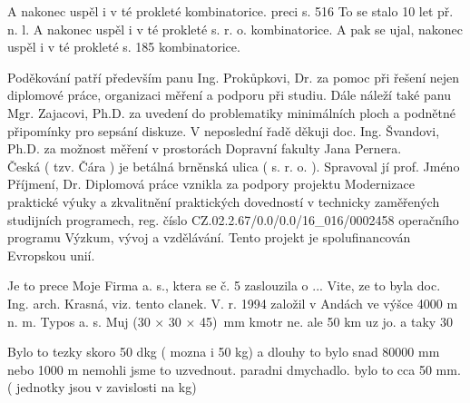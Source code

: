 
A nakonec uspěl i v té prokleté kombinatorice.
preci s. 516
To se stalo 10 let př. n. l.
A nakonec uspěl i v té prokleté s. r. o. kombinatorice. A pak se ujal, nakonec uspěl i v té prokleté s. 185 kombinatorice.

\noindent Poděkování patří především panu Ing. Prokůpkovi, Dr. za pomoc při řešení nejen diplomové práce, organizaci měření a podporu při studiu. Dále náleží také panu Mgr. Zajacovi, Ph.D. za uvedení do problematiky minimálních ploch a podnětné připomínky pro sepsání diskuze. V neposlední řadě děkuji doc. Ing. Švandovi, Ph.D. za možnost měření v prostorách Dopravní fakulty Jana Pernera.\\
Česká ( tzv. Čára ) je betálná brněnská ulica ( s. r. o. ). Spravoval jí prof. Jméno Příjmení, Dr.
\noindent Diplomová práce vznikla za podpory projektu Modernizace praktické výuky a zkvalitnění praktických dovedností v technicky zaměřených studijních programech, reg. číslo CZ.02.2.67/0.0/0.0/16\_016/0002458 operačního programu Výzkum, vývoj a vzdělávání. Tento projekt je spolufinancován Evropskou unií.

Je to prece Moje Firma a. s., ktera se č. 5 zaslouzila o ... Vite, ze to byla doc. Ing. arch. Krasná, viz. tento clanek.
V. r. 1994 založil v Andách ve výšce 4000 m n. m. Typos a. s.
Muj (30 × 30 × 45)~mm kmotr ne. ale 50 km uz jo. a taky 30 %


Bylo to tezky skoro 50 dkg ( mozna i 50 kg) a dlouhy to bylo snad 80000 mm nebo 1000 m nemohli jsme to uzvednout.
paradni dmychadlo. bylo to cca 50 mm. ( jednotky jsou v zavislosti na kg)
